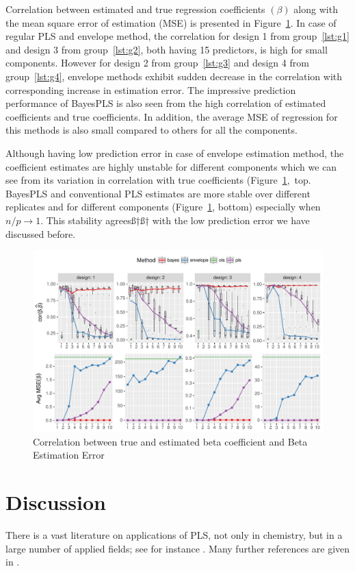 \documentclass[a4paper, 11pt]{article}
\begin{document}
Correlation between estimated and true regression coefficients $(\beta)$ along
with the mean square error of estimation (MSE) is presented in
Figure~\ref{fig:est-error-combined}. In case of regular PLS and envelope method,
the correlation for design 1 from group~\ref{lst:g1} and design 3 from
group~\ref{lst:g2}, both having 15 predictors, is high for small components.
However for design 2 from group~\ref{lst:g3} and
design 4 from group~\ref{lst:g4}, envelope methods exhibit sudden decrease in
the correlation with corresponding increase in estimation error. The impressive prediction performance of BayesPLS is also seen from the high correlation of estimated coefficients and true coefficients. In addition, the average MSE of regression for this methods is also small compared to others for all the components. 

Although having low prediction error in case of envelope estimation method, the coefficient estimates are highly unstable for different components which we can see from its variation in correlation with true coefficients (Figure~\ref{fig:est-error-combined},~top. BayesPLS and conventional PLS estimates are more stable over different replicates and for different components (Figure~\ref{fig:est-error-combined}, bottom) especially when $n/p \rightarrow 1$. This stability agreesß†ß† with the low prediction error we have discussed before.

\begin{figure}[!ht]
  \centering
  \includegraphics[width=\textwidth]{pdf/est-combined-plot.pdf}
  \caption{Correlation between true and estimated beta coefficient and Beta Estimation Error}
  \label{fig:est-error-combined}
\end{figure}

\section{Discussion}
There is a vast literature on applications of PLS, not only in chemistry, but in a large number of applied fields; see for instance \citet{boulesteix2007partial}. Many further references are given in \citet{mehmood2016diversity}.
\end{document}
